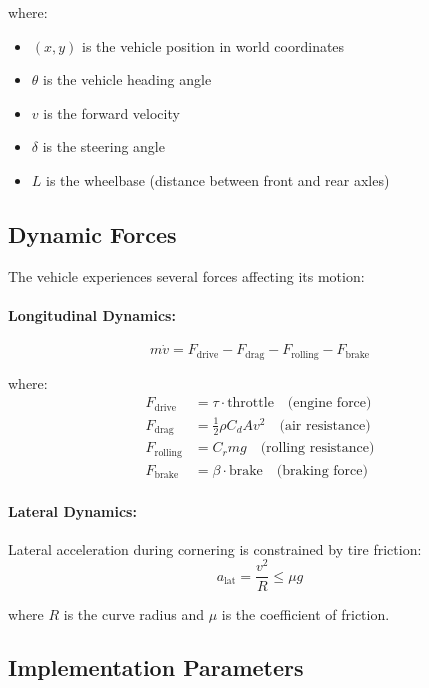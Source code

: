 \documentclass[11pt,a4paper]{article}
\begin{document}
where:
\begin{itemize}
    \item $(x, y)$ is the vehicle position in world coordinates
    \item $\theta$ is the vehicle heading angle
    \item $v$ is the forward velocity
    \item $\delta$ is the steering angle
    \item $L$ is the wheelbase (distance between front and rear axles)
\end{itemize}

\subsection{Dynamic Forces}

The vehicle experiences several forces affecting its motion:

\paragraph{Longitudinal Dynamics:}
\begin{equation}
m \dot{v} = F_{\text{drive}} - F_{\text{drag}} - F_{\text{rolling}} - F_{\text{brake}}
\end{equation}

where:
\begin{align}
F_{\text{drive}} &= \tau \cdot \text{throttle} \quad \text{(engine force)} \\
F_{\text{drag}} &= \frac{1}{2} \rho C_d A v^2 \quad \text{(air resistance)} \\
F_{\text{rolling}} &= C_r m g \quad \text{(rolling resistance)} \\
F_{\text{brake}} &= \beta \cdot \text{brake} \quad \text{(braking force)}
\end{align}

\paragraph{Lateral Dynamics:}
Lateral acceleration during cornering is constrained by tire friction:
\begin{equation}
a_{\text{lat}} = \frac{v^2}{R} \leq \mu g
\end{equation}

where $R$ is the curve radius and $\mu$ is the coefficient of friction.

\subsection{Implementation Parameters}
\end{document}
